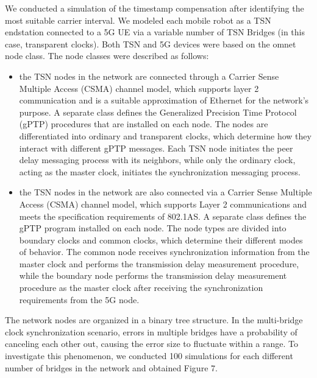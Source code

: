 \documentclass[english]{cccconf}
\begin{document}
We conducted a simulation of the timestamp compensation after identifying the most suitable carrier interval. We modeled each mobile robot as a TSN endstation connected to a 5G UE via a variable number of TSN Bridges (in this case, transparent clocks). Both TSN and 5G devices were based on the omnet node class. The node classes were described as follows:
\begin{itemize}
	\item the TSN nodes in the network are connected through a Carrier Sense Multiple Access (CSMA) channel model, which supports layer 2 communication and is a suitable approximation of Ethernet for the network's purpose. A separate class defines the Generalized Precision Time Protocol (gPTP) procedures that are installed on each node. The nodes are differentiated into ordinary and transparent clocks, which determine how they interact with different gPTP messages. Each TSN node initiates the peer delay messaging process with its neighbors, while only the ordinary clock, acting as the master clock, initiates the synchronization messaging process.
	\item the TSN nodes in the network are also connected via a Carrier Sense Multiple Access (CSMA) channel model, which supports Layer 2 communications and meets the specification requirements of 802.1AS. A separate class defines the gPTP program installed on each node. The node types are divided into boundary clocks and common clocks, which determine their different modes of behavior. The common node receives synchronization information from the master clock and performs the transmission delay measurement procedure, while the boundary node performs the transmission delay measurement procedure as the master clock after receiving the synchronization requirements from the 5G node.
\end{itemize}
The network nodes are organized in a binary tree structure. In the multi-bridge clock synchronization scenario, errors in multiple bridges have a probability of canceling each other out, causing the error size to fluctuate within a range. To investigate this phenomenon, we conducted 100 simulations for each different number of bridges in the network and obtained Figure 7.
\end{document}
